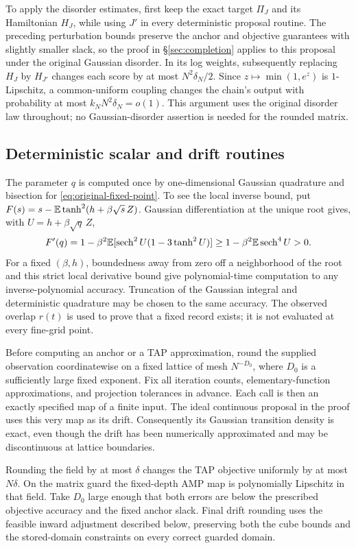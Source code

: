 \documentclass[11pt,reqno]{amsart}
\newcommand{\sech}{\operatorname{sech}}
\begin{document}
To apply the disorder estimates, first keep the exact target $\Pi_J$ and its Hamiltonian $H_J$, while using $J'$ in every deterministic proposal routine. The preceding perturbation bounds preserve the anchor and objective guarantees with slightly smaller slack, so the proof in \S\ref{sec:completion} applies to this proposal under the original Gaussian disorder. In its log weights, subsequently replacing $H_J$ by $H_{J'}$ changes each score by at most $N^2\delta_N/2$. Since $z\mapsto\min(1,e^z)$ is $1$-Lipschitz, a common-uniform coupling changes the chain's output with probability at most $k_NN^2\delta_N=o(1)$. This argument uses the original disorder law throughout; no Gaussian-disorder assertion is needed for the rounded matrix.

\subsection{Deterministic scalar and drift routines}

The parameter $q$ is computed once by one-dimensional Gaussian quadrature and bisection for \eqref{eq:original-fixed-point}. To see the local inverse bound, put $F(s)=s-{\mathbb{E}}\tanh^2(h+\beta\sqrt s\,Z)$. Gaussian differentiation at the unique root gives, with $U=h+\beta\sqrt q\,Z$,
\[
 F'(q)=1-\beta^2\bbE[\sech^2U(1-3\tanh^2U)]
       \ge1-\beta^2\bbE\sech^4U>0.
\]
For a fixed $(\beta,h)$, boundedness away from zero off a neighborhood of the root and this strict local derivative bound give polynomial-time computation to any inverse-polynomial accuracy. Truncation of the Gaussian integral and deterministic quadrature may be chosen to the same accuracy. The observed overlap $r(t)$ is used to prove that a fixed record exists; it is not evaluated at every fine-grid point.

Before computing an anchor or a TAP approximation, round the supplied observation coordinatewise on a fixed lattice of mesh $N^{-D_0}$, where $D_0$ is a sufficiently large fixed exponent. Fix all iteration counts, elementary-function approximations, and projection tolerances in advance. Each call is then an exactly specified map of a finite input. The ideal continuous proposal in the proof uses this very map as its drift. Consequently its Gaussian transition density is exact, even though the drift has been numerically approximated and may be discontinuous at lattice boundaries.

Rounding the field by at most $\delta$ changes the TAP objective uniformly by at most $N\delta$. On the matrix guard the fixed-depth AMP map is polynomially Lipschitz in that field. Take $D_0$ large enough that both errors are below the prescribed objective accuracy and the fixed anchor slack. Final drift rounding uses the feasible inward adjustment described below, preserving both the cube bounds and the stored-domain constraints on every correct guarded domain.
\end{document}
